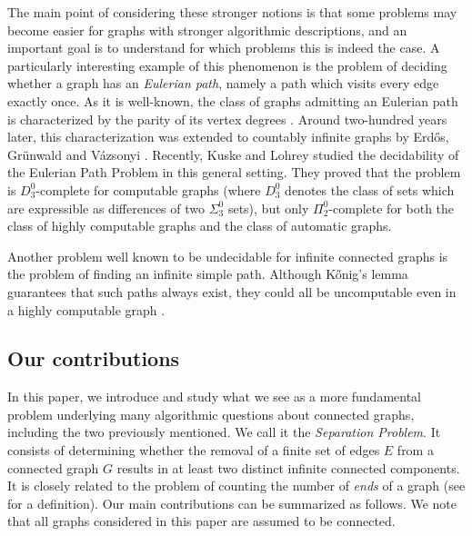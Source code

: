 \documentclass[10pt,A4]{amsart}
\theoremstyle{definition}
\theoremstyle{definition}
\begin{document}
 

The main point of considering these stronger notions is that some problems may become easier for graphs with stronger algorithmic descriptions, and an important goal is to understand for which problems this is indeed the case. A particularly interesting example of this phenomenon is the problem of deciding whether a graph has an \emph{Eulerian path}, namely a path which visits every edge exactly once. As it is well-known, the class of graphs admitting an Eulerian path is characterized by the parity of its vertex degrees \cite{Euler,hierholzer1873moglichkeit}. Around two-hundred years later, this characterization was extended to countably infinite graphs by Erd\H{o}s, Gr\"{u}nwald and V\'{a}zsonyi \cite{Erdos-et-al}. Recently, Kuske and Lohrey \cite{Kuske-Lohrey} studied the decidability of the Eulerian Path Problem in this general setting. They proved that the problem is $D_3^0$-complete for computable graphs (where $D_3^0$ denotes the class of sets which are expressible as differences of two $\Sigma_3^0$ sets), but only $\Pi_2^0$-complete for both the class of highly computable graphs and the class of automatic graphs. 

Another problem well known to be undecidable for infinite connected graphs is the problem of finding an infinite simple path. Although K\H{o}nig's lemma guarantees that such paths always exist, they could all be uncomputable even in a highly computable graph \cite{jockusch_pi_1972}.
\subsection{Our contributions} In this paper, we introduce and study what we see as a more fundamental problem underlying many algorithmic questions about connected graphs, including the two previously mentioned. We call it the \emph{Separation Problem}. It consists of determining whether the removal of a finite set of edges $E$ from a connected graph $G$ results in at least two distinct infinite connected components. It is closely related to the problem of counting the number of \emph{ends} of a graph (see  for a definition). Our main contributions can be summarized as follows. We note that all graphs considered in this paper are assumed to be connected. 

\medskip
\end{document}
